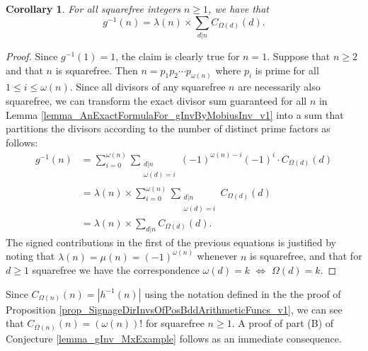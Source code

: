 \documentclass[11pt,reqno,a4letter]{article}
\numberwithin{figure}{section}
\numberwithin{table}{section}
\theoremstyle{plain}
\newtheorem{cor}[theorem]{Corollary}
\numberwithin{theorem}{section}
\theoremstyle{definition}
\begin{document}
\begin{cor} 
\label{cor_AnExactFormulaFor_gInvByMobiusInv_nSqFree_v2} 
For all squarefree integers $n \geq 1$, we have that 
\begin{equation} 
\label{eqn_gInvnSqFreeN_exactDivSum_Formula} 
g^{-1}(n) = \lambda(n) \times \sum_{d|n} C_{\Omega(d)}(d). 
\end{equation} 
\end{cor} 
\begin{proof} 
Since $g^{-1}(1) = 1$, the claim is clearly true for $n = 1$. Suppose that $n \geq 2$ and that 
$n$ is squarefree. Then $n = p_1p_2 \cdots p_{\omega(n)}$ where $p_i$ is prime for all 
$1 \leq i \leq \omega(n)$. Since all divisors of any squarefree $n$ are necessarily also squarefree, 
we can transform the exact divisor sum guaranteed for all $n$ in 
Lemma \ref{lemma_AnExactFormulaFor_gInvByMobiusInv_v1} into a sum that partitions the divisors 
according to the number of distinct prime factors as follows: 
\begin{align*} 
g^{-1}(n) & = \sum_{i=0}^{\omega(n)} \sum_{\substack{d|n \\ \omega(d)=i}} (-1)^{\omega(n) - i} (-1)^{i} \cdot 
     C_{\Omega(d)}(d) \\ 
     & = \lambda(n) \times \sum_{i=0}^{\omega(n)} \sum_{\substack{d|n \\ \omega(d)=i}} C_{\Omega(d)}(d) \\ 
     & = \lambda(n) \times \sum_{d|n} C_{\Omega(d)}(d). 
\end{align*} 
The signed contributions in the first of the previous equations is 
justified by noting that $\lambda(n) = \mu(n) = (-1)^{\omega(n)}$ 
whenever $n$ is squarefree, and that for $d \geq 1$
squarefree we have the correspondence 
$\omega(d) = k$ $\iff$ $\Omega(d) = k$. 
\end{proof} 

Since $C_{\Omega(n)}(n) = |h^{-1}(n)|$ using the notation defined in the the proof of 
Proposition \ref{prop_SignageDirInvsOfPosBddArithmeticFuncs_v1}, we can see that 
$C_{\Omega(n)}(n) = (\omega(n))!$ for squarefree $n \geq 1$. 
A proof of part (B) of Conjecture \ref{lemma_gInv_MxExample} 
follows as an immediate consequence. 
\end{document}
